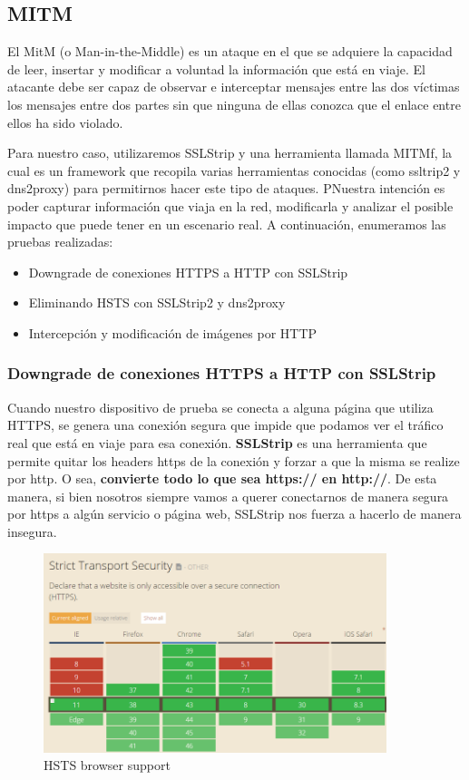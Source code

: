 \subsection{MITM}

El MitM (o Man-in-the-Middle) es un ataque en el que se adquiere la capacidad de leer, insertar y modificar a voluntad la información que 
está en viaje. El atacante debe ser capaz de observar e interceptar mensajes entre las dos víctimas los mensajes entre dos partes sin que 
ninguna de ellas conozca que el enlace entre ellos ha sido violado. 

Para nuestro caso, utilizaremos SSLStrip y una herramienta llamada MITMf, la cual es un framework que recopila varias herramientas conocidas 
(como ssltrip2 y dns2proxy) para permitirnos hacer este tipo de ataques. PNuestra intención es poder capturar información que viaja en la red, 
modificarla y analizar el posible impacto que puede tener en un escenario real. A continuación, enumeramos las pruebas realizadas:

\begin{itemize}
  \item Downgrade de conexiones HTTPS a HTTP con SSLStrip
  \item Eliminando HSTS con SSLStrip2 y dns2proxy
  \item Intercepción y modificación de imágenes por HTTP
\end{itemize}

\subsubsection{Downgrade de conexiones HTTPS a HTTP con SSLStrip}

Cuando nuestro dispositivo de prueba se conecta a alguna página que utiliza HTTPS, se genera una conexión segura que impide que podamos ver el 
tráfico real que está en viaje para esa conexión. \textbf{SSLStrip} es una herramienta que permite quitar los headers https de la conexión y forzar a 
que la misma se realize por http. O sea, \textbf{convierte todo lo que sea https:// en http://}. De esta manera, si bien nosotros siempre vamos 
a querer conectarnos de manera segura por https a algún servicio o página web, SSLStrip nos fuerza a hacerlo de manera insegura.

\begin{figure}
    \centering
    \includegraphics[width=10cm]{img/hsts.png}
    \caption{HSTS browser support}
\end{figure}

